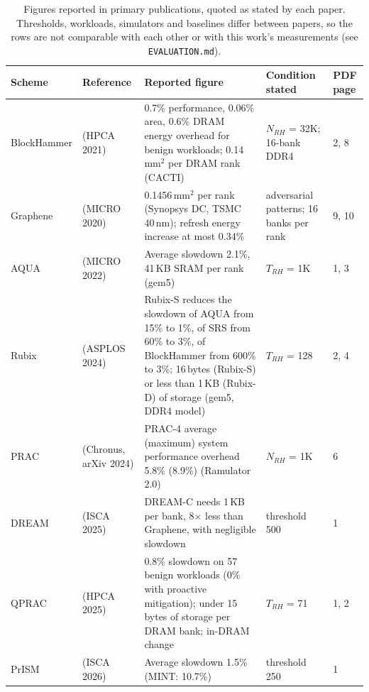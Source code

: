 \begin{table}[t]
\centering
\small
\caption{Figures reported in primary publications, quoted as stated by each paper. Thresholds, workloads, simulators and baselines differ between papers, so the rows are not comparable with each other or with this work's measurements (see \texttt{EVALUATION.md}).}
\label{tab:literature_reported}
\begin{tabular}{lp{2.4cm}p{5.6cm}p{3.6cm}l}
\toprule
\textbf{Scheme} & \textbf{Reference} & \textbf{Reported figure} & \textbf{Condition stated} & \textbf{PDF page} \\
\midrule
BlockHammer & \cite{segal2021blockhammer} (HPCA 2021) & 0.7\% performance, 0.06\% area, 0.6\% DRAM energy overhead for benign workloads; 0.14\,mm$^2$ per DRAM rank (CACTI) & $N_{RH}$ = 32K; 16-bank DDR4 & 2, 8 \\
Graphene & \cite{park2020graphene} (MICRO 2020) & 0.1456\,mm$^2$ per rank (Synopsys DC, TSMC 40\,nm); refresh energy increase at most 0.34\% & adversarial patterns; 16 banks per rank & 9, 10 \\
AQUA & \cite{park2022aqua} (MICRO 2022) & Average slowdown 2.1\%, 41\,KB SRAM per rank (gem5) & $T_{RH}$ = 1K & 1, 3 \\
Rubix & \cite{saxena2024rubix} (ASPLOS 2024) & Rubix-S reduces the slowdown of AQUA from 15\% to 1\%, of SRS from 60\% to 3\%, of BlockHammer from 600\% to 3\%; 16\,bytes (Rubix-S) or less than 1\,KB (Rubix-D) of storage (gem5, DDR4 model) & $T_{RH}$ = 128 & 2, 4 \\
PRAC & \cite{olgun2025chronus} (Chronus, arXiv 2024) & PRAC-4 average (maximum) system performance overhead 5.8\% (8.9\%) (Ramulator 2.0) & $N_{RH}$ = 1K & 6 \\
DREAM & \cite{dream2025} (ISCA 2025) & DREAM-C needs 1\,KB per bank, 8$\times$ less than Graphene, with negligible slowdown & threshold 500 & 1 \\
QPRAC & \cite{woo2025qprac} (HPCA 2025) & 0.8\% slowdown on 57 benign workloads (0\% with proactive mitigation); under 15 bytes of storage per DRAM bank; in-DRAM change & $T_{RH}$ = 71 & 1, 2 \\
PrISM & \cite{prism2026} (ISCA 2026) & Average slowdown 1.5\% (MINT: 10.7\%) & threshold 250 & 1 \\
\bottomrule
\end{tabular}
\end{table}
